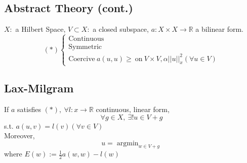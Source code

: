 \documentclass[a4paper,12pt]{article}
\newcommand{\R}{\mathbb{R}}
\DeclareMathOperator*{\argmin}{argmin}
\begin{document}
\subsection{Abstract Theory (cont.)}
$X:$ a Hilbert Space, $V \subset X:$ a closed subspace, $a:X \times X \rightarrow \R$ a bilinear form.
\begin{equation*}
(*)\begin{cases}
\text{Continuous}\\
\text{Symmetric}\\
\text{Coercive}\ a(u,u) \geq\ \text{on}\ V \times V, \alpha ||u||^2_x (\forall u \in V)
\end{cases}
\end{equation*}

\subsection{Lax-Milgram}
If $a$ satisfies $(*),\ \forall l:x \rightarrow \R$ continuous, linear form,
\begin{equation*}
\forall g \in X,\ \exists! u \in V+g
\end{equation*}
s.t. $a(u,v) = l(v)(\forall v \in V)$\\
Moreover, 
\begin{equation*}
u= \argmin_{w\in V+g}
\end{equation*} 
where $E(w):= \frac{1}{2}a(w,w)-l(w)$
\end{document}
